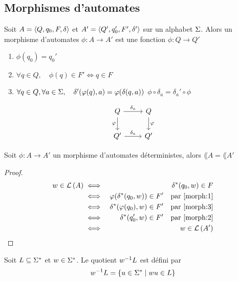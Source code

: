 \subsection{Morphismes d'automates}

\begin{definition}
	Soit $A = \langle Q, q_0, F, \delta \rangle$ et $ A' = \langle Q', q_0', F', \delta' \rangle $ sur un alphabet $\Sigma$.
	Alors un morphisme d'automates $\phi: A \to A'$ est une fonction $\phi: Q \to Q'$ \tlq
	\begin{enumerate}
		\item $\phi (q_0) = q_0'$ \label{morph:1}
		\item $\forall q \in Q,\quad  \phi (q) \in F' \iff q \in F$ \label{morph:2}
		\item $\forall q \in Q, \forall a \in \Sigma,\quad \delta'(\varphi (q), a) = \varphi (\delta(q,a))$ \ie $\phi \circ \delta_a = \delta_a '\circ \phi$ \label{morph:3}
	\end{enumerate}

	\[
		\begin{tikzcd}
			Q \arrow{r}{\delta_a} \arrow[swap]{d}{\phi} & Q \arrow{d}{\phi} \\
			Q' \arrow{r}{\delta_a} & Q'
		\end{tikzcd}
	\]

\end{definition}


\begin{exercice}
	Soit $\phi : A \to A'$ un morphisme d'automates déterministes, alors $\lang A = \lang {A'}$
\end{exercice}

\begin{proof}
	\begin{eqnarray*}
		w \in \mathcal{L}\left(A\right) &\iff& \delta^{*} (q_0, w) \in F \\
		&\iff& \varphi (\delta^{*} (q_0, w)) \in F' \quad \text{par } \ref{morph:1} \\
		&\iff& \delta^{*}( \varphi (q_0), w) \in F' \quad \text{par } \ref{morph:3} \\
		&\iff& \delta^{*}( q_0', w) \in F' \quad \text{par } \ref{morph:2} \\
		&\iff& w \in \mathcal{L}\left(A'\right)
	\end{eqnarray*}
\end{proof}


\begin{definition}
	Soit $L \subseteq \Sigma^{*}$ et $w \in \Sigma^{*}$. Le quotient $w^{-1} L$ est défini par
	$$ w^{-1} L = \left\{u \in \Sigma^{*} \mid wu \in L\right\} $$
\end{definition}

